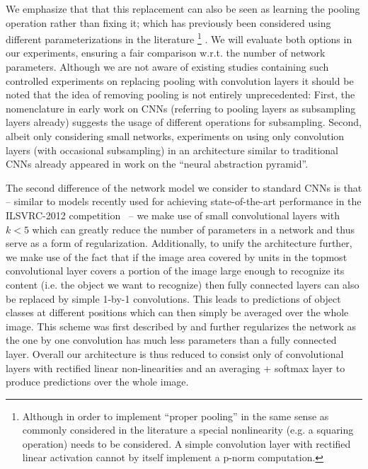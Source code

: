 \documentclass{article} \usepackage{iclr2015,times}
\begin{document}
We emphasize that that this
replacement can also be seen as 
learning the pooling operation rather than fixing it; which has
previously been considered using different parameterizations in the
literature \footnote{Although in order
  to implement ``proper pooling'' in the same sense as commonly
  considered in the literature a special nonlinearity (e.g. a squaring operation) needs to be
  considered. A simple convolution layer with rectified linear
  activation cannot by itself implement a p-norm computation.}
\citep{LeCun_IEEE1998,Gulcehre_2014,Jia_2012}.
We will evaluate both options in our experiments, ensuring a fair
comparison w.r.t. the number of network parameters. 
Although we are not aware of existing studies   
containing such controlled experiments on replacing pooling with convolution layers
it should be noted that the idea of removing pooling is not entirely unprecedented: 
First, the nomenclature in early work on CNNs \cite{LeCun_IEEE1998} (referring to pooling layers  as 
subsampling layers already) suggests the usage of different operations for subsampling. 
Second, albeit only considering small networks, 
experiments on using only convolution layers (with occasional subsampling) in an architecture similar
to traditional CNNs already appeared in work on the ``neural abstraction pyramid''\cite{Behnke2003}.

The second difference of the network model we consider to standard
CNNs is that -- similar to models recently used for achieving
state-of-the-art performance in the ILSVRC-2012 competition~\citep{VGG_2014,GoingDeep_2014} -- 
we make use of small convolutional layers with $k < 5$ which can
greatly reduce the number of parameters in a network and thus serve as
a form of regularization. 
Additionally, to unify the architecture further, we make use of the
fact that if the image area covered by units in the topmost
convolutional layer covers a portion of the image large enough to
recognize its content (i.e. the object we want to recognize) then
fully connected layers can also be replaced by simple 1-by-1
convolutions. This leads to predictions of object classes at different
positions which can then simply be averaged over the whole image. This
scheme was first described by \citet{Lin_2014} and
further regularizes the network as the one by one convolution has much
less parameters than a fully connected layer.
Overall our architecture is thus reduced to consist only of
convolutional layers with rectified linear non-linearities and an
averaging + softmax layer to produce predictions over the whole image.
\end{document}
